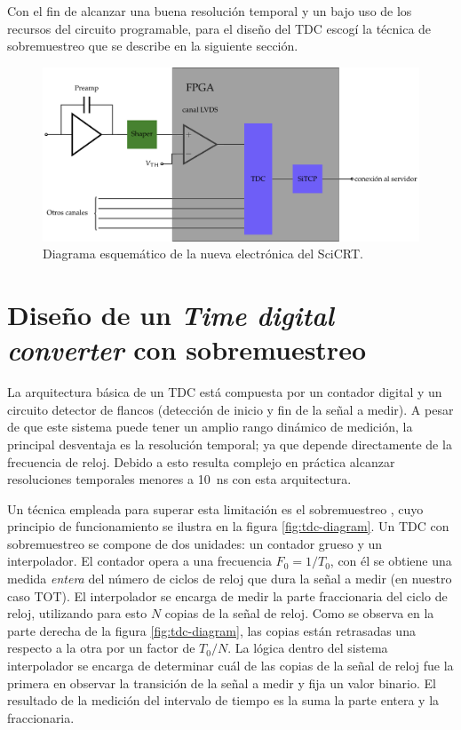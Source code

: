Con el fin de alcanzar una buena resolución temporal y un bajo uso de los recursos del circuito programable, para el diseño del TDC escogí la técnica de sobremuestreo que se describe en la siguiente sección.

\begin{figure}
        \centering
        \includegraphics[width=\textwidth]{nfeb-prot.pdf}
        \caption{Diagrama esquemático de la nueva electrónica del SciCRT.}
        \label{fig:nfeb-prot}
\end{figure}

\section{Diseño de un \emph{Time digital converter} con sobremuestreo}

La arquitectura básica de un TDC está compuesta por un contador digital y un circuito detector de flancos (detección de inicio y fin de la señal a medir). A pesar de que este sistema puede tener un amplio rango dinámico de medición, la principal desventaja es la resolución temporal; ya que depende directamente de la frecuencia de reloj. Debido a esto resulta complejo en práctica alcanzar resoluciones temporales menores a \SI{10}{\nano\second} con esta arquitectura.

Un técnica empleada para superar esta limitación es el sobremuestreo \cite{spencer06,balla14}, cuyo principio de funcionamiento se ilustra en la figura \ref{fig:tdc-diagram}. Un TDC con sobremuestreo se compone de dos unidades: un contador grueso y un interpolador. El contador opera a una frecuencia $F_{0}=1/T_{0}$, con él se obtiene una medida \emph{entera} del número de ciclos de reloj que dura la señal a medir (en nuestro caso TOT). El interpolador se encarga de medir la parte fraccionaria del ciclo de reloj, utilizando para esto $N$ copias de la señal de reloj. Como se observa en la parte derecha de la figura \ref{fig:tdc-diagram}, las copias están retrasadas una respecto a la otra por un factor de $T_{0}/N$.  La lógica dentro del sistema interpolador se encarga de determinar cuál de las copias de la señal de reloj fue la primera en observar la transición de la señal a medir y fija un valor binario. El resultado de la medición del intervalo de tiempo es la suma la parte entera y la fraccionaria.

